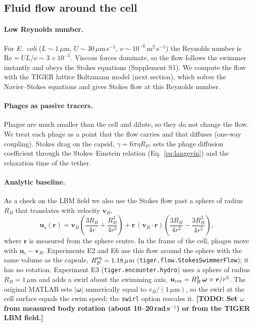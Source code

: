 \documentclass[12pt]{article}
\newcommand{\todo}[1]{{\color{blue}\textbf{[TODO: #1]}}}
\begin{document}
\subsection*{Fluid flow around the cell}
\paragraph{Low Reynolds number.} For \textit{E.~coli} ($L\sim 1\,\mu$m, $U\sim30\,\mu$m\,s$^{-1}$, $\nu\sim10^{-6}$\,m$^2$\,s$^{-1}$) the Reynolds number is $\mathrm{Re}=UL/\nu\sim3\times10^{-5}$\cite{purcell1977life}. Viscous forces dominate, so the flow follows the swimmer instantly and obeys the Stokes equations\cite{happel1983} (Supplement S1). We compute the flow with the TIGER lattice Boltzmann model (next section), which solves the Navier--Stokes equations and gives Stokes flow at this Reynolds number.

\paragraph{Phages as passive tracers.} Phages are much smaller than the cell and dilute, so they do not change the flow. We treat each phage as a point that the flow carries and that diffuses (one-way coupling). Stokes drag on the capsid, $\gamma=6\pi\eta R_P$, sets the phage diffusion coefficient through the Stokes--Einstein relation (Eq.~\eqref{eq:langevin}) and the relaxation time of the tether.

\paragraph{Analytic baseline.} As a check on the LBM field we also use the Stokes flow past a sphere of radius $R_B$ that translates with velocity $\bm v_B$,
\begin{equation}\label{eq:stokes_sphere}
\bm u_s(\bm r)=\bm v_B\left(\frac{3R_B}{4r}+\frac{R_B^{3}}{4r^{3}}\right)+\bm r\,(\bm v_B\cdot\bm r)\left(\frac{3R_B}{4r^{3}}-\frac{3R_B^{3}}{4r^{5}}\right),
\end{equation}
where $\bm r$ is measured from the sphere centre. In the frame of the cell, phages move with $\bm u_s-\bm v_B$. Experiments E2 and E6 use this flow around the sphere with the same volume as the capsule, $R_B^{\rm eq}=1.18\,\mu$m (\texttt{tiger.flow.StokesSwimmerFlow}); it has no rotation. Experiment E3 (\texttt{tiger.encounter.hydro}) uses a sphere of radius $R_B=1\,\mu$m and adds a swirl about the swimming axis, $\bm u_{\rm rot}=R_B^{3}\,\bm\omega\times\bm r/r^{3}$. The original MATLAB sets $|\bm\omega|$ numerically equal to $v_B/(1\,\mu\mathrm{m})$, so the swirl at the cell surface equals the swim speed; the \texttt{swirl} option rescales it. \todo{Set $\omega$ from measured body rotation (about 10--20\,rad\,s$^{-1}$) or from the TIGER LBM field.}
\end{document}
